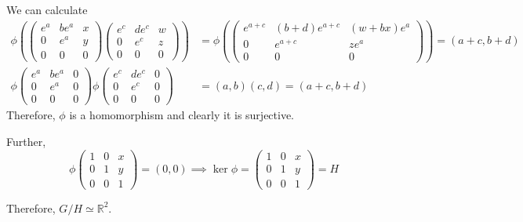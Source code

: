 \documentclass[12pt]{article}
\newcommand{\R}{\mathbb{R}}
\begin{document}
        We can calculate 
        \begin{align*}
            \phi\left(\begin{pmatrix}
                e^a & be^a & x\\
                0 & e^a & y\\
                0 & 0 & 0
            \end{pmatrix}\begin{pmatrix}
                e^c & de^c & w\\
                0 & e^c & z\\
                0 & 0 & 0
            \end{pmatrix}\right) &= \phi\left(\begin{pmatrix}
                e^{a+c} & (b + d)e^{a+c} & (w + bx)e^a\\
                0 & e^{a+c} & ze^a\\
                0 & 0 & 0
            \end{pmatrix}\right) = (a+c, b+d)\\ 
            \phi\begin{pmatrix}
                e^a & be^a & 0\\
                0 & e^a & 0\\
                0 & 0 & 0
            \end{pmatrix}\phi\begin{pmatrix}
                e^c & de^c & 0\\
                0 & e^c & 0\\
                0 & 0 & 0
            \end{pmatrix} &= (a,b)(c,d) = (a+c, b+d)
        \end{align*}
        Therefore, $\phi$ is a homomorphism and clearly it is surjective. 

        Further, 
        \[\phi \begin{pmatrix}
            1 & 0 & x\\
            0 & 1 & y\\
            0 & 0 & 1
        \end{pmatrix} = (0, 0) \implies \ker \phi = \begin{pmatrix}
            1 & 0 & x\\
            0 & 1 & y\\
            0 & 0 & 1
        \end{pmatrix} = H\]

        Therefore, $G/H \simeq \R^2$.
\end{document}
